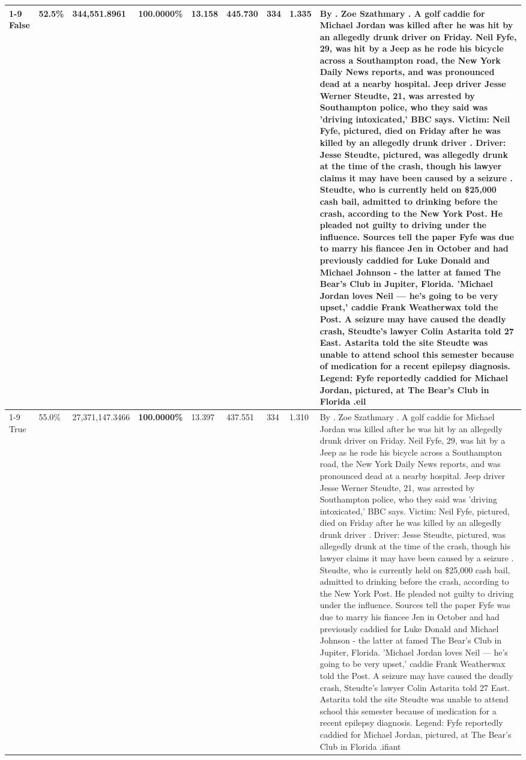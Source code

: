 \begin{table}[H]
\begin{tabular}{lllrlllll}
\cline{1-9}
False & 52.5\% & 344,551.8961 & \bfseries \color{red} 100.0000\% & 13.158 & 445.730 & 334 & 1.335 & By . Zoe Szathmary . A golf caddie for Michael Jordan was killed after he was hit by an allegedly drunk driver on Friday. Neil Fyfe, 29, was hit by a Jeep as he rode his bicycle across a Southampton road, the New York Daily News reports, and was pronounced dead at a nearby hospital. Jeep driver Jesse Werner Steudte, 21, was arrested by Southampton police, who they said was 'driving intoxicated,' BBC says. Victim: Neil Fyfe, pictured, died on Friday after he was killed by an allegedly drunk driver . Driver: Jesse Steudte, pictured, was allegedly drunk at the time of the crash, though his lawyer claims it may have been caused by a seizure . Steudte, who is currently held on \$25,000 cash bail, admitted to drinking before the crash, according to the New York Post. He pleaded not guilty to driving under the influence. Sources tell the paper Fyfe was due to marry his fiancee Jen in October and had previously caddied for Luke Donald and Michael Johnson - the latter at famed The Bear's Club in Jupiter, Florida. 'Michael Jordan loves Neil — he’s going to be very upset,' caddie Frank Weatherwax told the Post. A seizure may have caused the deadly crash, Steudte's lawyer Colin Astarita told 27 East. Astarita told the site Steudte was unable to attend school this semester because of medication for a recent epilepsy diagnosis. Legend: Fyfe reportedly caddied for Michael Jordan, pictured, at The Bear's Club in Florida .eil \\
\cline{1-9}
True & 55.0\% & 27,371,147.3466 & \bfseries \color{red} 100.0000\% & 13.397 & 437.551 & 334 & 1.310 & By . Zoe Szathmary . A golf caddie for Michael Jordan was killed after he was hit by an allegedly drunk driver on Friday. Neil Fyfe, 29, was hit by a Jeep as he rode his bicycle across a Southampton road, the New York Daily News reports, and was pronounced dead at a nearby hospital. Jeep driver Jesse Werner Steudte, 21, was arrested by Southampton police, who they said was 'driving intoxicated,' BBC says. Victim: Neil Fyfe, pictured, died on Friday after he was killed by an allegedly drunk driver . Driver: Jesse Steudte, pictured, was allegedly drunk at the time of the crash, though his lawyer claims it may have been caused by a seizure . Steudte, who is currently held on \$25,000 cash bail, admitted to drinking before the crash, according to the New York Post. He pleaded not guilty to driving under the influence. Sources tell the paper Fyfe was due to marry his fiancee Jen in October and had previously caddied for Luke Donald and Michael Johnson - the latter at famed The Bear's Club in Jupiter, Florida. 'Michael Jordan loves Neil — he’s going to be very upset,' caddie Frank Weatherwax told the Post. A seizure may have caused the deadly crash, Steudte's lawyer Colin Astarita told 27 East. Astarita told the site Steudte was unable to attend school this semester because of medication for a recent epilepsy diagnosis. Legend: Fyfe reportedly caddied for Michael Jordan, pictured, at The Bear's Club in Florida .ifiant \\

\end{tabular}
\end{table}
